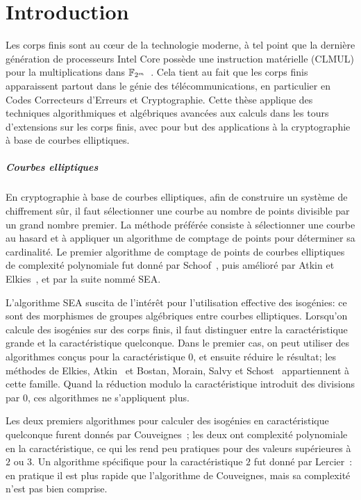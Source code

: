 \chapter[Intoduction (Français)][Introduction]{Introduction}

Les corps finis sont au cœur de la technologie moderne, à tel point
que la dernière génération de processeurs Intel Core possède une
instruction matérielle (CLMUL) pour la multiplications dans
$\mathbb{F}_{2^m}$~\cite{intel-carryless}. Cela tient au fait que les corps
finis apparaissent partout dans le génie des télécommunications, en
particulier en Codes Correcteurs d'Erreurs et Cryptographie. Cette
thèse applique des techniques algorithmiques et algébriques avancées
aux calculs dans les tours d'extensions sur les corps finis, avec pour
but des applications à la cryptographie à base de courbes elliptiques.

\paragraph*{Courbes elliptiques}
En cryptographie à base de courbes elliptiques, afin de construire un
système de chiffrement sûr, il faut sélectionner une courbe au nombre
de points divisible par un grand nombre premier. La méthode préférée
consiste à sélectionner une courbe au hasard et à appliquer un
algorithme de comptage de points pour déterminer sa cardinalité. Le
premier algorithme de comptage de points de courbes elliptiques de
complexité polynomiale fut donné par Schoof~\cite{schoof85}, puis
amélioré par Atkin et Elkies~\cite{atkin88,elkies98,schoof95}, et par
la suite nommé SEA.

L'algorithme SEA suscita de l'intérêt pour l'utilisation effective des
isogénies: ce sont des morphismes de groupes algébriques entre courbes
elliptiques. Lorsqu'on calcule des isogénies sur des corps finis, il
faut distinguer entre la caractéristique grande et la caractéristique
quelconque. Dans le premier cas, on peut utiliser des algorithmes
conçus pour la caractéristique $0$, et ensuite réduire le résultat;
les méthodes de Elkies\cite{elkies98,morain95}, Atkin~\cite{schoof95}
et Bostan, Morain, Salvy et Schost~\cite{bostan+morain+salvy+schost08}
appartiennent à cette famille. Quand la réduction modulo la
caractéristique introduit des divisions par $0$, ces algorithmes ne
s'appliquent plus.

Les deux premiers algorithmes pour calculer des isogénies en
caractéristique quelconque furent donnés par
Couveignes~\cite{couveignes94,couveignes96}; les deux ont complexité
polynomiale en la caractéristique, ce qui les rend peu pratiques pour
des valeurs supérieures à $2$ ou $3$. Un algorithme spécifique pour la
caractéristique $2$ fut donné par Lercier~\cite{lercier96}: en
pratique il est plus rapide que l'algorithme de Couveignes, mais sa
complexité n'est pas bien comprise.


